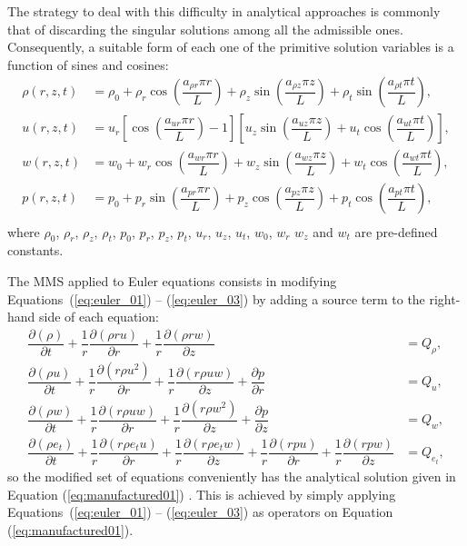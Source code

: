 \documentclass[10pt]{article}
\newcommand{\Diff}[2] {\dfrac{\partial( #1)}{\partial #2}}
\newcommand{\diff}[2] {\dfrac{\partial #1}{\partial #2}}
\begin{document}
The strategy to deal with this difficulty in analytical approaches is commonly that of discarding the singular solutions among all the admissible ones. %
Consequently, a suitable form of each one of the primitive solution variables is a function of sines and cosines:
\begin{equation}
 \label{eq:manufactured01}
\begin{split}
\rho(r,z,t)&= \rho_0+\rho_r \cos\left(\dfrac{a_{\rho r} \pi r}{L}\right)+\rho_z \sin\left(\dfrac{a_{\rho z} \pi z}{L}\right)+\rho_t \sin\left(\dfrac{a_{\rho t} \pi t}{L}\right),\\
u(r,z,t)&= u_r  \left[\cos\left(\dfrac{a_{ur} \pi r}{L}\right)-1 \right] \left[u_z \sin\left(\dfrac{a_{uz} \pi z}{L}\right) + u_t\cos\left(\dfrac{a_{ut} \pi t}{L}\right) \right],\\
w(r,z,t)&=w_0+w_r \cos\left(\dfrac{a_{w r} \pi r}{L}\right)+w_z \sin\left(\dfrac{a_{w z} \pi z}{L}\right)+w_t \cos\left(\dfrac{a_{w t} \pi t}{L}\right),\\
p(r,z,t)&=p_0+p_r \sin\left(\dfrac{a_{p r} \pi r}{L}\right)+p_z \cos\left(\dfrac{a_{p z} \pi z}{L}\right)+p_t \cos\left(\dfrac{a_{p t} \pi t}{L}\right),\\
\end{split}
\end{equation}
%
where $\rho_0$, $\rho_r$,  $\rho_z$,  $\rho_t$, $p_0$, $p_r$, $p_z$, $p_t$, $u_r$, $u_z$, $u_t$, $w_0$, $w_r$ $w_z$ and $w_t$ are pre-defined constants.

The MMS applied to Euler equations consists in modifying Equations~(\ref{eq:euler_01}) -- (\ref{eq:euler_03}) by adding a source term to the right-hand side of each equation:
\begin{equation}
 \label{eq:ns2d_mod}
\begin{split}
 \Diff{\rho}{t}+ \dfrac{1}{r} \Diff{\rho r u}{r}+ \dfrac{1}{r}\Diff{\rho r w}{z}&=Q_\rho, \\
\Diff{\rho u}{t} +\dfrac{1}{r}\Diff{r \rho u^2 }{r}+ \dfrac{1}{r}\Diff{r \rho u w}{z}+\diff{p}{r} &=Q_u,\\
\Diff{\rho w}{t} + \dfrac{1}{r}\Diff{r \rho u w}{r}+ \dfrac{1}{r}\Diff{r \rho w^2 }{z}+\diff{p}{z} &=Q_w,\\
\Diff{\rho e_t}{ t}+\dfrac{1}{r}\Diff{r \rho e_t u}{ r}+\dfrac{1}{r}\Diff{r \rho e_t w}{z} +\dfrac{1}{r}\Diff{r p  u}{ r}+\dfrac{1}{r}\Diff{r p w}{z}&=Q_{e_t},
\end{split}
\end{equation}
so the modified set of equations conveniently has the analytical solution given in Equation (\ref{eq:manufactured01}) \cite{Roy2002}. This is achieved by simply applying Equations~(\ref{eq:euler_01}) -- (\ref{eq:euler_03}) as operators on Equation (\ref{eq:manufactured01}).
\end{document}
